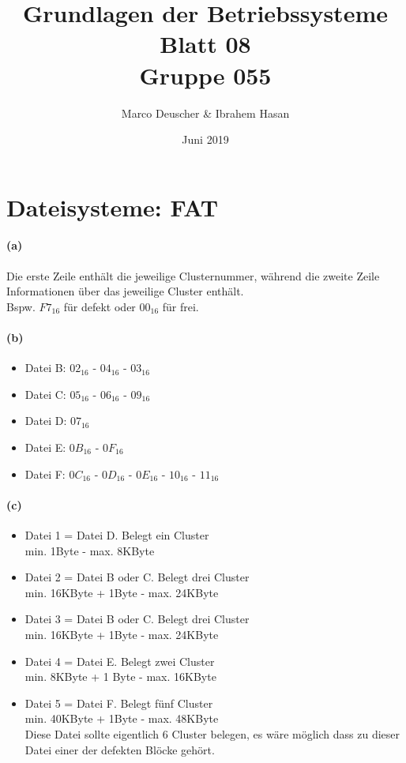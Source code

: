 \documentclass[a4paper]{article}
\title{Grundlagen der Betriebssysteme\\ Blatt 08 \\ Gruppe 055}
\author{Marco Deuscher & Ibrahem Hasan}
\date{Juni 2019}
\begin{document}
\maketitle

\section{Dateisysteme: FAT}
\paragraph{(a)}
Die erste Zeile enthält die jeweilige Clusternummer, während die zweite Zeile Informationen über das jeweilige Cluster enthält.\\
Bspw. $F7_{16}$ für defekt oder $00_{16}$ für frei.

\paragraph{(b)}
\begin{itemize}
    \item Datei B: $02_{16}$ - $04_{16}$ - $03_{16}$
    \item Datei C: $05_{16}$ - $06_{16}$ - $09_{16}$
    \item Datei D: $07_{16}$
    \item Datei E: $0B_{16}$ - $0F_{16}$ 
    \item Datei F: $0C_{16}$ - $0D_{16}$ - $0E_{16}$ - $10_{16}$ - $11_{16}$
\end{itemize}

\paragraph{(c)}
\begin{itemize}
    \item Datei 1 = Datei D. Belegt ein Cluster\\
        min. 1Byte - max. 8KByte
    \item Datei 2 = Datei B oder C. Belegt drei Cluster\\
        min. 16KByte + 1Byte - max. 24KByte
    \item Datei 3 = Datei B oder C. Belegt drei Cluster\\
         min. 16KByte + 1Byte - max. 24KByte
    \item Datei 4 = Datei E. Belegt zwei Cluster\\
        min. 8KByte + 1 Byte - max. 16KByte
    \item Datei 5 = Datei F. Belegt fünf Cluster\\
        min. 40KByte + 1Byte - max. 48KByte\\
        Diese Datei sollte eigentlich 6 Cluster belegen, es wäre möglich dass zu dieser Datei einer der defekten Blöcke gehört.
\end{itemize}
\end{document}
